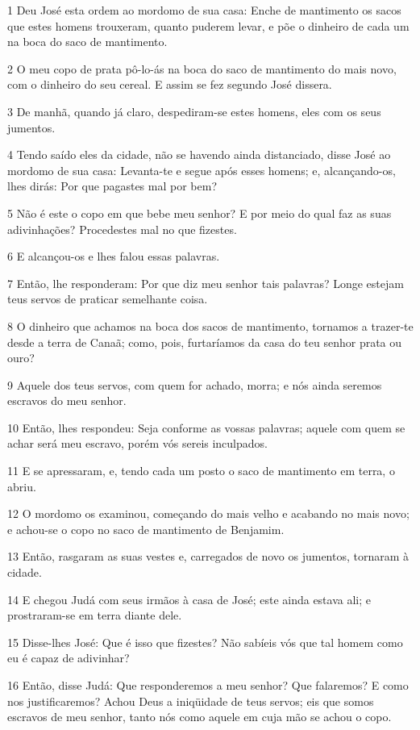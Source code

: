 \par 1 Deu José esta ordem ao mordomo de sua casa: Enche de mantimento os sacos que estes homens trouxeram, quanto puderem levar, e põe o dinheiro de cada um na boca do saco de mantimento.
\par 2 O meu copo de prata pô-lo-ás na boca do saco de mantimento do mais novo, com o dinheiro do seu cereal. E assim se fez segundo José dissera.
\par 3 De manhã, quando já claro, despediram-se estes homens, eles com os seus jumentos.
\par 4 Tendo saído eles da cidade, não se havendo ainda distanciado, disse José ao mordomo de sua casa: Levanta-te e segue após esses homens; e, alcançando-os, lhes dirás: Por que pagastes mal por bem?
\par 5 Não é este o copo em que bebe meu senhor? E por meio do qual faz as suas adivinhações? Procedestes mal no que fizestes.
\par 6 E alcançou-os e lhes falou essas palavras.
\par 7 Então, lhe responderam: Por que diz meu senhor tais palavras? Longe estejam teus servos de praticar semelhante coisa.
\par 8 O dinheiro que achamos na boca dos sacos de mantimento, tornamos a trazer-te desde a terra de Canaã; como, pois, furtaríamos da casa do teu senhor prata ou ouro?
\par 9 Aquele dos teus servos, com quem for achado, morra; e nós ainda seremos escravos do meu senhor.
\par 10 Então, lhes respondeu: Seja conforme as vossas palavras; aquele com quem se achar será meu escravo, porém vós sereis inculpados.
\par 11 E se apressaram, e, tendo cada um posto o saco de mantimento em terra, o abriu.
\par 12 O mordomo os examinou, começando do mais velho e acabando no mais novo; e achou-se o copo no saco de mantimento de Benjamim.
\par 13 Então, rasgaram as suas vestes e, carregados de novo os jumentos, tornaram à cidade.
\par 14 E chegou Judá com seus irmãos à casa de José; este ainda estava ali; e prostraram-se em terra diante dele.
\par 15 Disse-lhes José: Que é isso que fizestes? Não sabíeis vós que tal homem como eu é capaz de adivinhar?
\par 16 Então, disse Judá: Que responderemos a meu senhor? Que falaremos? E como nos justificaremos? Achou Deus a iniqüidade de teus servos; eis que somos escravos de meu senhor, tanto nós como aquele em cuja mão se achou o copo.
